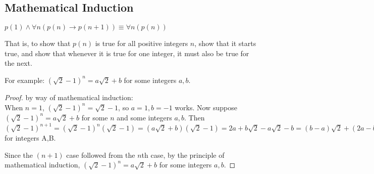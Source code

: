 \documentclass{article}
\theoremstyle{definition}
\begin{document}
\subsection*{Mathematical Induction}
$p(1) \land \forall n (p(n) \to p(n+1)) \equiv \forall n (p(n))$

That is, to show that $p(n)$ is true for all positive integers $n$, show that
it starts true, and show that whenever it is true for one integer, it must also
be true for the next.

For example: $(\sqrt{2} - 1)^n = a\sqrt{2} + b$ for some integers $a,b$.

\begin{proof} by way of mathematical induction:\\
  When $n=1$, $(\sqrt{2} - 1)^n=\sqrt{2}-1$, so $a=1, b=-1$ works.
  Now suppose $(\sqrt{2}-1)^n = a\sqrt{2} + b$ for some $n$ and some integers $a,b$.
  Then $(\sqrt{2} - 1)^{n+1} = (\sqrt{2}-1)^n(\sqrt{2}-1)=(a\sqrt{2}+b)(\sqrt{2}-1)=
  2a+b\sqrt{2}-a\sqrt{2}-b=(b-a)\sqrt{2}+(2a-b)=A\sqrt{2}+B$ for integers A,B.

  Since the $(n+1)$ case followed from the $n$th case, by the principle of
  mathematical induction, $(\sqrt{2}-1)^n=a\sqrt{2}+b$ for some integers $a,b$.
\end{proof}
\end{document}
